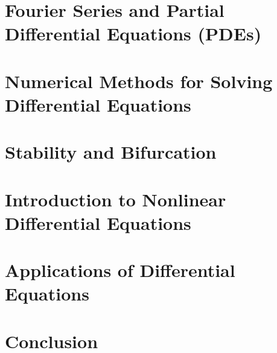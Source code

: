 \documentclass[11pt]{article}
\begin{document}
	\section{Fourier Series and Partial Differential Equations (PDEs)}
		\lipsum[1]
	\section{Numerical Methods for Solving Differential Equations}
		\lipsum[1]
	\section{Stability and Bifurcation}
		\lipsum[1]
	\section{Introduction to Nonlinear Differential Equations}
		\lipsum[1]
	\section{Applications of Differential Equations}
		\lipsum[1]
	\section{Conclusion}
		\lipsum[1]	
	
		
			\nocite{zill-2012}
\end{document}
